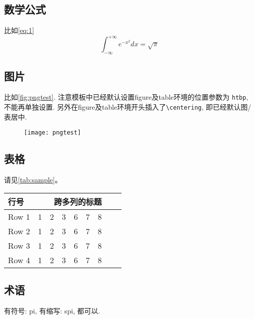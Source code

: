 \subsection{数学公式}

比如\autoref{eq:1}
\begin{equation}
    \label{eq:1}
    \int_{-\infty}^{+\infty} e^{-x^2} dx = \sqrt{\pi}
\end{equation}

\subsection{图片}

比如\autoref{fig:pngtest}. 注意模板中已经默认设置figure及table环境的位置参数为
\verb|htbp|, 不能再单独设置. 另外在figure及table环境开头插入了\verb|\centering|,
即已经默认图/表居中.
\begin{figure}
    \texttt{[image: pngtest]}
    \label{fig:pngtest}
\end{figure}

\subsection{表格}

请见\autoref{tab:sample}。
\begin{table}
    \label{tab:sample}
    \setlength{\tabcolsep}{4pt}%
    \renewcommand{\arraystretch}{1.2}%
    \begin{tabular}{lcccccccc}
        \toprule
        行号 & \multicolumn{8}{c}{跨多列的标题}\\
        \midrule
        Row 1 & 1 & 2 & 3 & 6 & 7 & 8 \\
        Row 2 & 1 & 2 & 3 & 6 & 7 & 8 \\
        Row 3 & 1 & 2 & 3 & 6 & 7 & 8 \\
        Row 4 & 1 & 2 & 3 & 6 & 7 & 8 \\
        \bottomrule
    \end{tabular}
\end{table}

\subsection{术语}

有符号: \gls{pi}, 有缩写: \gls{spi}, 都可以.

